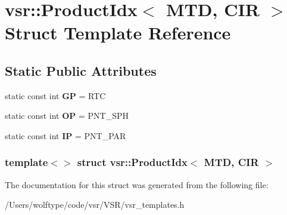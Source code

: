\hypertarget{structvsr_1_1_product_idx_3_01_m_t_d_00_01_c_i_r_01_4}{\section{vsr\-:\-:Product\-Idx$<$ M\-T\-D, C\-I\-R $>$ Struct Template Reference}
\label{structvsr_1_1_product_idx_3_01_m_t_d_00_01_c_i_r_01_4}
}
\subsection*{Static Public Attributes}
\begin{DoxyCompactItemize}
\item 
\hypertarget{structvsr_1_1_product_idx_3_01_m_t_d_00_01_c_i_r_01_4_a2bde9c4f98dd09b21712d0f99a66afa0}{static const int {\bfseries G\-P} = R\-T\-C}\label{structvsr_1_1_product_idx_3_01_m_t_d_00_01_c_i_r_01_4_a2bde9c4f98dd09b21712d0f99a66afa0}

\item 
\hypertarget{structvsr_1_1_product_idx_3_01_m_t_d_00_01_c_i_r_01_4_a13b324e42998dfc365c09dfa274c21bb}{static const int {\bfseries O\-P} = P\-N\-T\-\_\-\-S\-P\-H}\label{structvsr_1_1_product_idx_3_01_m_t_d_00_01_c_i_r_01_4_a13b324e42998dfc365c09dfa274c21bb}

\item 
\hypertarget{structvsr_1_1_product_idx_3_01_m_t_d_00_01_c_i_r_01_4_ab0ba629715aca7b2b8e9b1c47e839d0b}{static const int {\bfseries I\-P} = P\-N\-T\-\_\-\-P\-A\-R}\label{structvsr_1_1_product_idx_3_01_m_t_d_00_01_c_i_r_01_4_ab0ba629715aca7b2b8e9b1c47e839d0b}

\end{DoxyCompactItemize}
\subsubsection*{template$<$$>$ struct vsr\-::\-Product\-Idx$<$ M\-T\-D, C\-I\-R $>$}



The documentation for this struct was generated from the following file\-:\begin{DoxyCompactItemize}
\item 
/\-Users/wolftype/code/vsr/\-V\-S\-R/vsr\-\_\-templates.\-h\end{DoxyCompactItemize}
